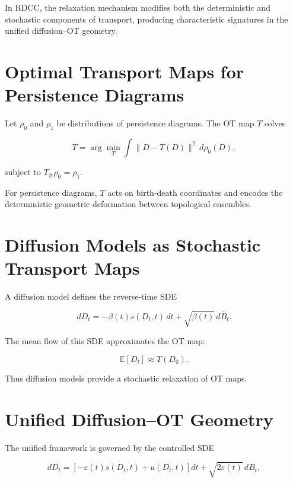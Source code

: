 \documentclass[11pt,a4paper]{article}
\begin{document}
In RDCC, the relaxation mechanism modifies both the deterministic and stochastic 
components of transport, producing characteristic signatures in the unified 
diffusion–OT geometry.
\section{Optimal Transport Maps for Persistence Diagrams}

Let $\rho_{0}$ and $\rho_{1}$ be distributions of persistence diagrams. The OT map 
$T$ solves

\begin{equation}
    T = \arg\min_{T}
    \int \| D - T(D) \|^{2} \, d\rho_{0}(D),
\end{equation}

subject to $T_{\#} \rho_{0} = \rho_{1}$.

For persistence diagrams, $T$ acts on birth-death coordinates and encodes the 
deterministic geometric deformation between topological ensembles.
\section{Diffusion Models as Stochastic Transport Maps}

A diffusion model defines the reverse-time SDE

\begin{equation}
    dD_{t}
    = - \beta(t) s(D_{t}, t) \, dt
      + \sqrt{\beta(t)} \, d\bar{B}_{t}.
\end{equation}

The mean flow of this SDE approximates the OT map:

\begin{equation}
    \mathbb{E}[D_{t}] \approx T(D_{0}).
\end{equation}

Thus diffusion models provide a stochastic relaxation of OT maps.
\section{Unified Diffusion–OT Geometry}

The unified framework is governed by the controlled SDE

\begin{equation}
    dD_{t}
    = \left[
        - \varepsilon(t) s(D_{t}, t)
        + u(D_{t}, t)
      \right] dt
      + \sqrt{2 \varepsilon(t)} \, dB_{t},
\end{equation}
\end{document}
